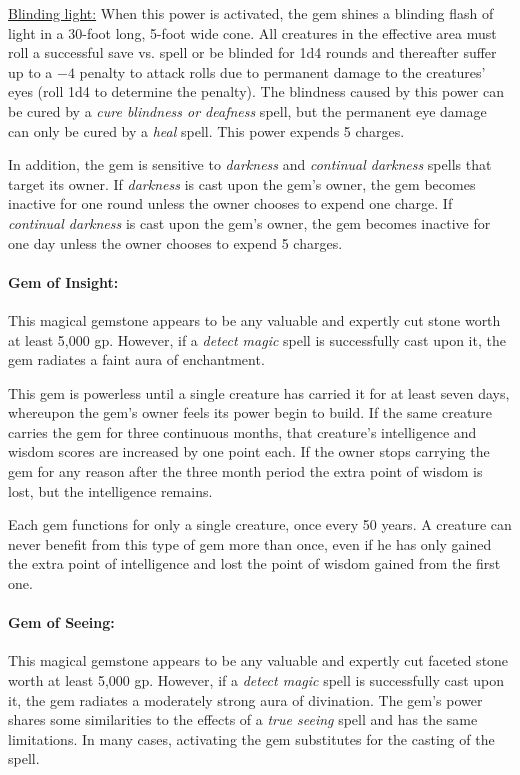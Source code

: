 \begin{multicols}{2}
\underline{Blinding light:} When this power is activated, the gem shines a blinding flash of light in a 30-foot long, 5-foot wide cone.  All creatures in the effective area must roll a successful save vs. spell or be blinded for 1d4 rounds and thereafter suffer up to a $-4$ penalty to attack rolls due to permanent damage to the creatures' eyes (roll 1d4 to determine the penalty).  The blindness caused by this power can be cured by a \textit{cure blindness or deafness} spell, but the permanent eye damage can only be cured by a \textit{heal} spell.  This power expends 5 charges.

In addition, the gem is sensitive to \textit{darkness} and \textit{continual darkness} spells that target its owner.  If \textit{darkness} is cast upon the gem's owner, the gem becomes inactive for one round unless the owner chooses to expend one charge.  If \textit{continual darkness} is cast upon the gem's owner, the gem becomes inactive for one day unless the owner chooses to expend 5 charges.

\paragraph{Gem of Insight:} This magical gemstone appears to be any valuable and expertly cut stone worth at least 5,000 gp.  However, if a \textit{detect magic} spell is successfully cast upon it, the gem radiates a faint aura of enchantment.  

This gem is powerless until a single creature has carried it for at least seven days, whereupon the gem's owner feels its power begin to build.  If the same creature carries the gem for three continuous months, that creature's intelligence and wisdom scores are increased by one point each.  If the owner stops carrying the gem for any reason after the three month period the extra point of wisdom is lost, but the intelligence remains.

Each gem functions for only a single creature, once every 50 years.  A creature can never benefit from this type of gem more than once, even if he has only gained the extra point of intelligence and lost the point of wisdom gained from the first one.

\paragraph{Gem of Seeing:} This magical gemstone appears to be any valuable and expertly cut faceted stone worth at least 5,000 gp.  However, if a \textit{detect magic} spell is successfully cast upon it, the gem radiates a moderately strong aura of divination.  The gem's power shares some similarities to the effects of a \textit{true seeing} spell and has the same limitations.  In many cases, activating the gem substitutes for the casting of the spell.  


\end{multicols}
